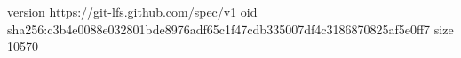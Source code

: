 version https://git-lfs.github.com/spec/v1
oid sha256:c3b4e0088e032801bde8976adf65c1f47cdb335007df4c3186870825af5e0ff7
size 10570
